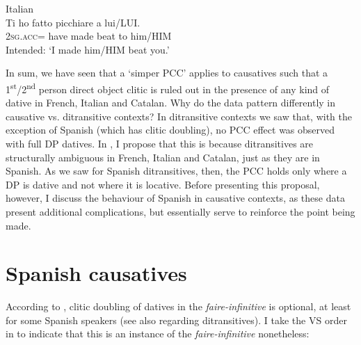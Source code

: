 \documentclass[output=paper,colorlinks,citecolor=brown,nonflat]{langsci/langscibook}
\begin{document}
\ea%
    \label{ex:sheehan:28}
    Italian\footnotemark{}\\
    \gll    *Ti ho        fatto   picchiare   a    lui/LUI.\\
            2\textsc{sg.acc}= have   made   beat     to him/HIM\\
    \glt    Intended: ‘I made him/HIM beat you.’
\z
{}

In sum, we have seen that a ‘simper PCC’ applies to causatives such that a 1\textsuperscript{st}/2\textsuperscript{nd} person direct object clitic is ruled out in the presence of any kind of dative in French, Italian and Catalan. Why do the data pattern differently in causative vs. ditransitive contexts? In ditransitive contexts we saw that, with the exception of Spanish (which has clitic doubling), no PCC effect was observed with full DP datives. In , I propose that this is because ditransitives are structurally ambiguous in French, Italian and Catalan, just as they are in Spanish. As we saw for Spanish ditransitives, then, the PCC holds only where a DP is dative and not where it is locative. Before presenting this proposal, however, I discuss the behaviour of Spanish in causative contexts, as these data present additional complications, but essentially serve to reinforce the point being made.

\section{Spanish causatives}\label{sec:sheehan:4}

According to \citet{Torrego2010}, clitic doubling of datives in the \textit{faire-infinitive} is optional, at least for some Spanish speakers (see also \citealt{Pineda2013} regarding ditransitives). I take the VS order in  to indicate that this is an instance of the \textit{faire-infinitive} nonetheless:
\end{document}
